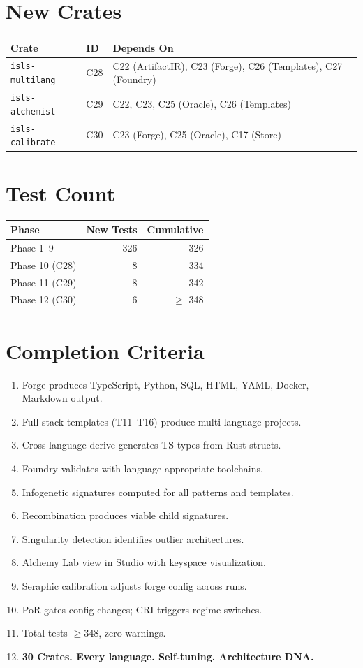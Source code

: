 \documentclass[11pt,a4paper,twoside]{article}
\theoremstyle{definition}
\theoremstyle{plain}
\theoremstyle{remark}
\begin{document}
\section{New Crates}

\begin{tabularx}{\textwidth}{l l X}
\toprule
\textbf{Crate} & \textbf{ID} & \textbf{Depends On} \\
\midrule
\texttt{isls-multilang} & C28 & C22 (ArtifactIR), C23 (Forge),
  C26 (Templates), C27 (Foundry) \\
\texttt{isls-alchemist} & C29 & C22, C23, C25 (Oracle),
  C26 (Templates) \\
\texttt{isls-calibrate} & C30 & C23 (Forge), C25 (Oracle),
  C17 (Store) \\
\bottomrule
\end{tabularx}

\section{Test Count}

\begin{tabular}{l r r}
\toprule
\textbf{Phase} & \textbf{New Tests} & \textbf{Cumulative} \\
\midrule
Phase 1--9 & 326 & 326 \\
Phase 10 (C28) & 8 & 334 \\
Phase 11 (C29) & 8 & 342 \\
Phase 12 (C30) & 6 & $\ge$ 348 \\
\bottomrule
\end{tabular}

\section{Completion Criteria}

\begin{enumerate}[nosep]
  \item Forge produces TypeScript, Python, SQL, HTML, YAML, Docker,
        Markdown output.
  \item Full-stack templates (T11--T16) produce multi-language
        projects.
  \item Cross-language derive generates TS types from Rust structs.
  \item Foundry validates with language-appropriate toolchains.
  \item Infogenetic signatures computed for all patterns and
        templates.
  \item Recombination produces viable child signatures.
  \item Singularity detection identifies outlier architectures.
  \item Alchemy Lab view in Studio with keyspace visualization.
  \item Seraphic calibration adjusts forge config across runs.
  \item PoR gates config changes; CRI triggers regime switches.
  \item Total tests $\ge 348$, zero warnings.
  \item \textbf{30 Crates. Every language. Self-tuning.
        Architecture DNA.}
\end{enumerate}
\end{document}
